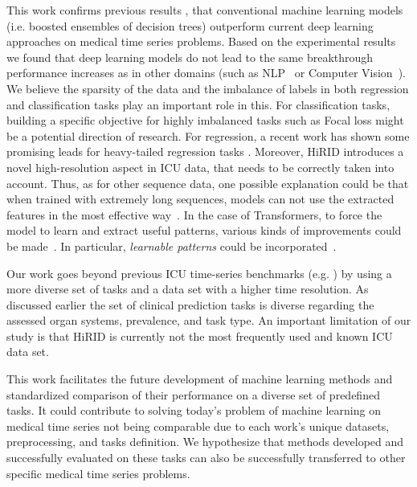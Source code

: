 \documentclass{article}
\begin{document}
This work confirms previous results \citep{hyland2020early}, that conventional machine learning models (i.e. boosted ensembles of decision trees) outperform current deep learning approaches on medical time series problems. Based on the experimental results we found that deep learning models do not lead to the same breakthrough performance increases as in other domains (such as NLP~\cite{devlin2018bert} or Computer Vision~\cite{dosovitskiy2020image}). We believe the sparsity of the data and the imbalance of labels in both regression and classification tasks play an important role in this. For classification tasks, building a specific objective for highly imbalanced tasks such as Focal loss \cite{lin2017focal} might be a potential direction of research. For regression, a recent work has shown some promising leads for heavy-tailed regression tasks \cite{yang2021delving}.
Moreover, HiRID introduces a novel high-resolution aspect in ICU data, that needs to be correctly taken into account. Thus, as for other sequence data, one possible explanation could be that when trained with extremely long sequences, models can not use the extracted features in the most effective way~\cite{zaheer2020big}. In the case of Transformers, to force the model to learn and extract useful patterns, various kinds of improvements could be made~\cite{tay2020efficient}. In particular, \textit{learnable patterns} could be incorporated~\cite{roy2021efficient}. 

Our work goes beyond previous ICU time-series benchmarks (e.g. \citep{harutyunyan2019multitask}) by using a more diverse set of tasks and a data set with a higher time resolution. As discussed earlier the set of clinical prediction tasks is diverse regarding the assessed organ systems, prevalence, and task type. An important limitation of our study is that HiRID is currently not the most frequently used and known ICU data set.

This work facilitates the future development of machine learning methods and standardized comparison of their performance on a diverse set of predefined tasks. It could contribute to solving today's problem of machine learning on medical time series not being comparable due to each work's unique datasets, preprocessing, and tasks definition. We hypothesize that methods developed and successfully evaluated on these tasks can also be successfully transferred to other specific medical time series problems.
\end{document}
